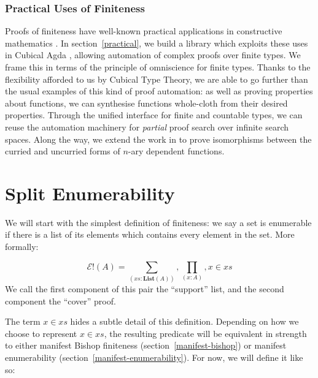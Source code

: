 \subsubsection{Practical Uses of Finiteness}
Proofs of finiteness have well-known practical applications in
constructive mathematics \cite{firsovDependentlyTypedProgramming2015}.
In section~\ref{practical}, we build a library which exploits these uses in
Cubical Agda \cite{vezzosiCubicalAgdaDependently2019}, allowing automation of
complex proofs over finite types.
We frame this in terms of the principle of omniscience for finite types.
Thanks to the flexibility afforded to us by Cubical Type Theory, we are able to
go further than the usual examples of this kind of proof automation: as well as
proving properties about functions, we can synthesise functions whole-cloth from
their desired properties.
Through the unified interface for finite and countable types, we can
reuse the automation machinery for \emph{partial} proof search over infinite
search spaces.
Along the way, we extend the work in \cite{allaisGenericLevelPolymorphic2019} to
prove isomorphisms between the curried and uncurried forms of \(n\)-ary
dependent functions.
\section{Split Enumerability} \label{split-enumerable}
We will start with the simplest definition of finiteness: we say a set is
enumerable if there is a list of its elements which contains every element in
the set.
More formally:
\begin{definition}
  \begin{equation}
    \mathcal{E}!(A) = \sum_{(\mathit{xs} : \textbf{List}(A))} , \prod_{(x : A)} , x \in xs
  \end{equation}
  We call the first component of this pair the ``support'' list, and the second
  component the ``cover'' proof.
\end{definition}

The term \(x \in \mathit{xs}\) hides a subtle detail of this definition.
Depending on how we choose to represent \(x \in \mathit{xs}\), the resulting
predicate will be equivalent in strength to either manifest Bishop finiteness
(section~\ref{manifest-bishop}) or manifest enumerability
(section~\ref{manifest-enumerability}).
For now, we will define it like so:

